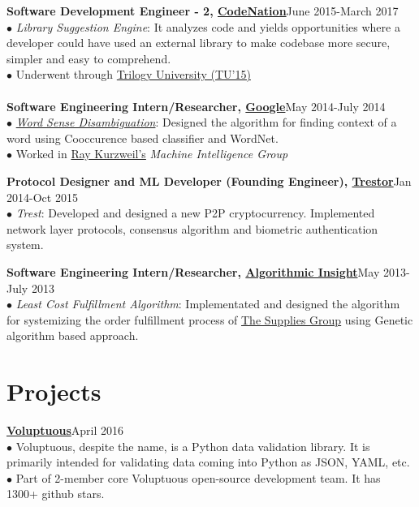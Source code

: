 \documentclass[margin,line]{resume}
\begin{document}
\begin{resume}
{\bf Software Development Engineer - 2, \href{http://codenation.co.in/}{CodeNation}}\hfill June 2015-March 2017\\
	$\bullet$ \emph{Library Suggestion Engine}: It analyzes code and yields opportunities where a developer could have used an external library to make codebase more secure, simpler and easy to comprehend.\\
      $\bullet$ Underwent through \href{https://hbr.org/2001/04/no-ordinary-boot-camp}{Trilogy University (TU'15)}\\\\
      {\bf Software Engineering Intern/Researcher, \href{https://www.google.com/}{Google}}\hfill May 2014-July 2014\\
      $\bullet$ \href{https://en.wikipedia.org/wiki/Word-sense_disambiguation}{\emph{Word Sense Disambiguation}}: Designed the algorithm for finding context of a word using Cooccurence based classifier and WordNet.\\
      $\bullet$ Worked in \href{http://en.wikipedia.org/wiki/Ray_Kurzweil}{Ray Kurzweil's} \emph{Machine Intelligence Group}

 {\bf Protocol Designer and ML Developer (Founding Engineer), \href{http://trestor.org/}{Trestor}}\hfill Jan 2014-Oct 2015\\
	$\bullet$ \emph{Trest}: Developed and designed a new P2P cryptocurrency. Implemented network layer protocols, consensus algorithm and biometric authentication system.

         {\bf Software Engineering Intern/Researcher, \href{http://tatrasdata.com/}{Algorithmic Insight}}\hfill May 2013-July 2013\\
      $\bullet$ \emph{Least Cost Fulfillment Algorithm}: Implementated and designed the algorithm for systemizing the order fulfillment process of \href{http://www.suppliesguys.com/}{The Supplies Group} using Genetic algorithm based approach.

\section{\mysidestyle \bf Projects}

 {\bf\href{https://github.com/alecthomas/voluptuous}{Voluptuous}}\hfill April 2016 \\
$\bullet$ Voluptuous, despite the name, is a Python data validation library. It is primarily intended for validating data coming into Python as JSON, YAML, etc. \\
$\bullet$ Part of 2-member core Voluptuous open-source development team. It has 1300+ github stars.


\end{resume}
\end{document}
